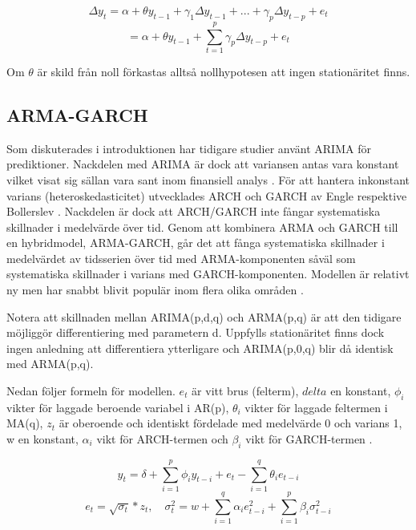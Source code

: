 \documentclass[12pt]{article}
\begin{document}
\begin{equation*}
    \Delta y_t = \alpha + \theta y_{t-1} + \gamma_1\Delta y_{t-1} + ... + \gamma_p\Delta y_{t-p} + e_t
\end{equation*}
\begin{equation}
        = \alpha + \theta y_{t-1} + \sum_{t=1}^{p}\gamma_p \Delta y_{t-p} + e_t
\end{equation}

Om \(\theta\) är skild från noll förkastas alltså nollhypotesen att ingen stationäritet finns.

\subsection{ARMA-GARCH}
Som diskuterades i introduktionen har tidigare studier använt ARIMA för prediktioner. Nackdelen med ARIMA är dock att variansen antas vara konstant vilket visat sig sällan vara sant inom finansiell analys \parencite{montgomery2015forecasting}. För att hantera inkonstant varians (heteroskedasticitet) utvecklades ARCH och GARCH av Engle \parencite*{engle1982autoregressive} respektive Bollerslev \parencite*{bollerslev1986generalized}. Nackdelen är dock att ARCH/GARCH inte fångar systematiska skillnader i medelvärde över tid. Genom att kombinera ARMA och GARCH till en hybridmodel, ARMA-GARCH, går det att fånga systematiska skillnader i medelvärdet av tidsserien över tid med ARMA-komponenten såväl som systematiska skillnader i varians med GARCH-komponenten. Modellen är relativt ny men har snabbt blivit populär inom flera olika områden \parencite{chen2011short}. 
\par Notera att skillnaden mellan ARIMA(p,d,q) och ARMA(p,q) är att den tidigare möjliggör differentiering med parametern d. Uppfylls stationäritet finns dock ingen anledning att differentiera ytterligare och ARIMA(p,0,q) blir då identisk med ARMA(p,q). 
\par Nedan följer formeln för modellen. \(e_t\) är vitt brus (felterm), \(delta\) en konstant, \(\phi_i\) vikter för laggade beroende variabel i AR(p), \(\theta_i\) vikter för laggade feltermen i MA(q), \(z_t\) är oberoende och identiskt fördelade med medelvärde 0 och varians 1, w en konstant, \(\alpha_i\) vikt för ARCH-termen och \(\beta_i\) vikt för GARCH-termen \parencite{bollerslev1986generalized, montgomery2015forecasting}.

\begin{equation}
    y_t = \delta + \sum_{i=1}^{p}\phi_iy_{t-i}  +e_t - \sum_{i=1}^{q}\theta_i e_{t-i} 
\end{equation}
\begin{equation}
    e_t=\sqrt{\sigma_t}*z_t,\quad \sigma^2_t=w + \sum_{i=1}^{q}\alpha_i e^2_{t-i} + \sum_{i=1}^{p}\beta_i \sigma^2_{t-i}
\end{equation}
\end{document}

